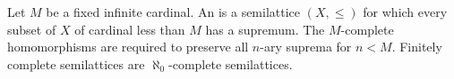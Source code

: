 Let $M$ be a fixed infinite cardinal. An  is a semilattice $(X, \leqslant)$ for which every subset of $X$ of cardinal less than $M$ has a supremum. The $M$-complete homomorphisms are required to preserve all $n$-ary suprema for $n < M$. Finitely complete semilattices are $\aleph_0$-complete semilattices.
